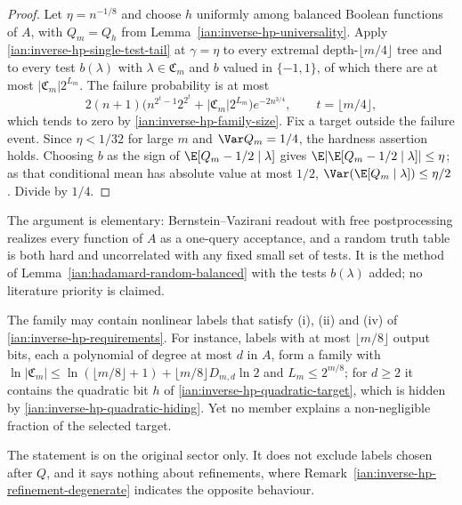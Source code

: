 \begin{proof}
Let \(\eta=n^{-1/8}\) and choose \(h\) uniformly among balanced Boolean functions of \(A\), with \(Q_m=Q_h\) from Lemma~\ref{ian:inverse-hp-universality}. Apply \eqref{ian:inverse-hp-single-test-tail} at \(\gamma=\eta\) to every extremal depth-\(\lfloor m/4\rfloor\) tree and to every test \(b(\lambda)\) with \(\lambda\in\mathfrak C_m\) and \(b\) valued in \(\{-1,1\}\), of which there are at most \(|\mathfrak C_m|2^{L_m}\). The failure probability is at most
\[
 2(n+1)\bigl(n^{2^t-1}2^{2^t}+|\mathfrak C_m|2^{L_m}\bigr)e^{-2n^{3/4}},
 \qquad t=\lfloor m/4\rfloor,
 \tag{37.9}
\]
which tends to zero by \eqref{ian:inverse-hp-family-size}. Fix a target outside the failure event. Since \(\eta<1/32\) for large \(m\) and \(\Var Q_m=1/4\), the hardness assertion holds. Choosing \(b\) as the sign of \(\E[Q_m-1/2\mid\lambda]\) gives \(\E|\E[Q_m-1/2\mid\lambda]|\le\eta\); as that conditional mean has absolute value at most \(1/2\), \(\Var(\E[Q_m\mid\lambda])\le\eta/2\). Divide by \(1/4\).
\end{proof}

\begin{remark}
\label{ian:inverse-hp-family-scope}
The argument is elementary: Bernstein--Vazirani readout with free postprocessing realizes every function of \(A\) as a one-query acceptance, and a random truth table is both hard and uncorrelated with any fixed small set of tests. It is the method of Lemma~\ref{ian:hadamard-random-balanced} with the tests \(b(\lambda)\) added; no literature priority is claimed.

The family may contain nonlinear labels that satisfy (i), (ii) and (iv) of \eqref{ian:inverse-hp-requirements}. For instance, labels with at most \(\lfloor m/8\rfloor\) output bits, each a polynomial of degree at most \(d\) in \(A\), form a family with \(\ln|\mathfrak C_m|\le\ln(\lfloor m/8\rfloor+1)+\lfloor m/8\rfloor D_{m,d}\ln2\) and \(L_m\le2^{m/8}\); for \(d\ge2\) it contains the quadratic bit \(h\) of \eqref{ian:inverse-hp-quadratic-target}, which is hidden by \eqref{ian:inverse-hp-quadratic-hiding}. Yet no member explains a non-negligible fraction of the selected target.

The statement is on the original sector only. It does not exclude labels chosen after \(Q\), and it says nothing about refinements, where Remark~\ref{ian:inverse-hp-refinement-degenerate} indicates the opposite behaviour.
\end{remark}

